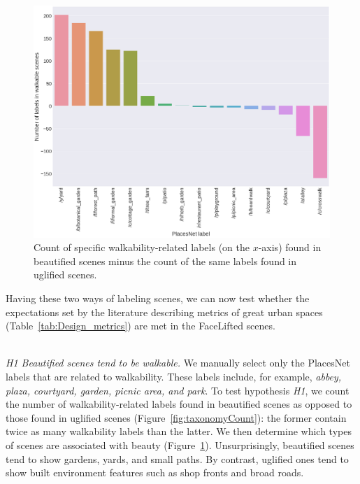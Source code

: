 \begin{figure}[h]
	\centering
	\includegraphics[width=\columnwidth]{Plot/walkable_taxonomy.png}
	\caption{Count of specific walkability-related labels  (on the $x$-axis) found in beautified scenes minus the count of the same labels found in uglified scenes.}
	\label{fig:WalkableTnomy}
\end{figure}


Having these two ways of labeling scenes, we can now test whether the expectations set by the literature describing metrics of great urban spaces (Table~\ref{tab:Design_metrics}) are  met in the FaceLifted scenes. 


\mbox{ } \\
\noindent
\emph{H1 Beautified scenes tend to be walkable.}
We manually select only the PlacesNet labels that are related to walkability. These labels include, for example, \textit{abbey, plaza, courtyard, garden, picnic area, \textrm{and} park}. To test hypothesis \emph{H1}, we count the number of walkability-related labels found in beautified scenes as opposed to those found in uglified scenes (Figure~\ref{fig:taxonomyCount}): the former contain twice as many walkability labels than the latter. We then determine which types of scenes are associated with beauty (Figure~\ref{fig:WalkableTnomy}). Unsurprisingly, beautified scenes tend to show gardens, yards, and small paths. By contrast, uglified ones tend to show built environment features such as shop fronts and broad roads. 


